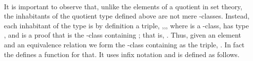 \documentclass[a4paper,USenglish,cleveref,autoref,thm-restate]{lipics-v2019}
\begin{document}
\begin{code}
\>[0]\AgdaOperator{\AgdaFunction{\AgdaUnderscore{}//\AgdaUnderscore{}}}\AgdaSpace{}%
\AgdaSymbol{:}%
\>[8]\AgdaSymbol{(}\AgdaSpace{}%
\AgdaSymbol{:}\AgdaSpace{}%
\AgdaSpace{}%
\AgdaSpace{}%
\AgdaSymbol{)}\AgdaSpace{}%
\AgdaSpace{}%
\AgdaSpace{}%
\AgdaSpace{}%
\AgdaSpace{}%
\AgdaSpace{}%
\AgdaSymbol{(}\AgdaSpace{}%
\AgdaSpace{}%
\AgdaSymbol{)}\AgdaSpace{}%
\AgdaSpace{}%
\<%
\\
\>[0]\AgdaSpace{}%
\AgdaOperator{\AgdaFunction{//}}\AgdaSpace{}%
\AgdaSpace{}%
\AgdaSymbol{=}\AgdaSpace{}%
\AgdaSpace{}%
\AgdaSpace{}%
\AgdaSpace{}%
\AgdaSymbol{\AgdaUnderscore{}}\AgdaSpace{}%
\AgdaFunction{,}%
\>[21]\AgdaSpace{}%
\AgdaSpace{}%
\AgdaSpace{}%
\AgdaSpace{}%
\AgdaFunction{,}%
\>[32]\AgdaSpace{}%
\AgdaSpace{}%
\AgdaSymbol{(}\AgdaSpace{}%
\AgdaOperator{\AgdaFunction{[}}\AgdaSpace{}%
\AgdaSpace{}%
\AgdaOperator{\AgdaFunction{]}}\AgdaSpace{}%
\AgdaSpace{}%
\AgdaSymbol{)}\<%
\end{code}
It is important to observe that, unlike the elements of a quotient in set theory, the inhabitants of the quotient type defined above are not mere -classes.  Instead, each inhabitant of the type \AgdaSpace{}\AgdaOperator{\AgdaFunction{//}}\AgdaSpace{} is by definition a triple, \AgdaSymbol{(}\AgdaSpace{}\AgdaSpace{},\AgdaSpace{}\AgdaSpace{},\AgdaSpace{}\AgdaSpace{}\AgdaSymbol{)}, where  is a -class,  has type \AgdaSpace{}, and  is a proof that  is the -class containing ; that is, \AgdaSpace{}%
\AgdaSpace{}%
\AgdaSymbol{(}\AgdaSpace{}%
\AgdaOperator{\AgdaFunction{[}}\AgdaSpace{}%
\AgdaSpace{}%
\AgdaOperator{\AgdaFunction{]}}\AgdaSpace{}%
\AgdaSpace{}%
\AgdaSymbol{)}.
Thus, given an element \AgdaSpace{}\AgdaSymbol{:}\AgdaSpace{} and an equivalence relation  we form the -class containing  as the triple, \AgdaSymbol{(}\AgdaSpace{}\AgdaOperator{\AgdaFunction{[}}\AgdaSpace{}\AgdaSpace{}\AgdaOperator{\AgdaFunction{]}}\AgdaSpace{}\AgdaSpace{}\AgdaOperator{\AgdaInductiveConstructor{,}}\AgdaSpace{}\AgdaSpace{}\AgdaOperator{\AgdaInductiveConstructor{,}}\AgdaSpace{}\AgdaSpace{}\AgdaSymbol{)}. In fact the \agdaualib defines a function for that.  It uses infix notation and is defined as follows.
\begin{code}\end{code}
\end{document}
